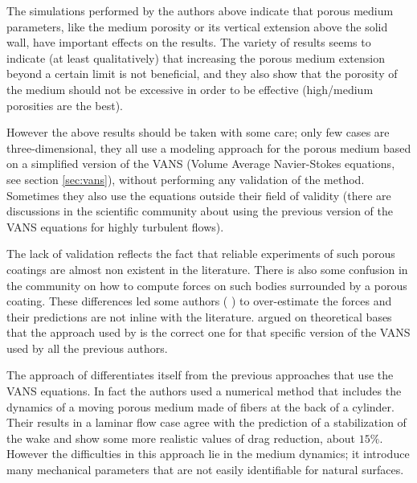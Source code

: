The simulations performed by the authors above indicate that porous medium parameters, like the medium porosity or its vertical extension above the solid wall, have important effects on the results.
The variety of results seems to indicate (at least qualitatively) that increasing the porous medium extension beyond a certain limit is not beneficial, and they also show that the porosity of the medium should not be excessive in order to be effective (high/medium porosities are the best).

However the above results should be taken with some care; only few cases are three-dimensional, they all use a modeling approach for the porous medium based on a simplified version of the VANS (Volume Average Navier-Stokes equations, see section \ref{sec:vans}), without performing any validation of the method.
Sometimes they also use the equations outside their field of validity (there are discussions in the scientific community about using the previous version of the VANS equations for highly turbulent flows).

The lack of validation reflects the fact that reliable experiments of such porous coatings are almost non existent in the literature.
There is also some confusion in the community on how to compute forces on such bodies surrounded by a porous coating. These differences led some authors ( \citet{naito2012numerical}) to over-estimate the forces and their predictions are not inline with the literature.
\citet{caltagirone1994interaction} argued on theoretical bases that the approach used by \citet{bruneau2004passive} is the correct one for that specific version of the VANS used by all the previous authors. 

 
The approach of \citet{favier2009passive} differentiates itself from the previous approaches that use the VANS equations. In fact the authors used a numerical method that includes the dynamics of a moving porous medium made of fibers at the back of a cylinder.
Their results in a laminar flow case agree with the prediction of a stabilization of the wake and show some more realistic values of drag reduction, about $15\%$.
However the difficulties in this approach lie in the medium dynamics; it introduce many mechanical parameters that are not easily identifiable for natural surfaces.

